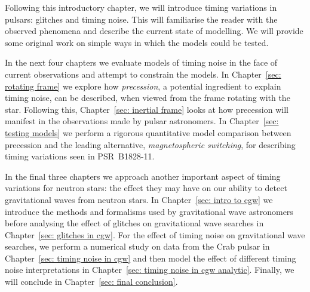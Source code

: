 \documentclass[../full_thesis/full_thesis.tex]{subfiles}
\begin{document}
Following this introductory chapter, we will introduce timing variations in
pulsars: glitches and timing noise. This will familiarise the reader with the
observed phenomena and describe the current state of modelling.  We will
provide some original work on simple ways in which the models could be tested.

In the next four chapters we evaluate models of timing noise in the face of
current observations and attempt to constrain the models.  In Chapter~\ref{sec:
rotating frame} we explore how \emph{precession}, a potential ingredient to
explain timing noise, can be described, when viewed from the frame rotating
with the star. Following this, Chapter~\ref{sec: inertial frame} looks at how
precession will manifest in the observations made by pulsar astronomers. In
Chapter~\ref{sec: testing models} we perform a rigorous quantitative model
comparison between precession and the leading alternative, \emph{magnetospheric
switching}, for describing timing variations seen in PSR~B1828-11.

In the final three chapters we approach another important aspect of timing
variations for neutron stars: the effect they may have on our ability to detect
gravitational waves from neutron stars. In Chapter~\ref{sec: intro to cgw} we
introduce the methods and formalisms used by gravitational wave astronomers
before analysing the effect of glitches on gravitational wave searches in
Chapter~\ref{sec: glitches in cgw}. For the effect of timing noise on
gravitational wave searches, we perform a numerical study on data from the Crab
pulsar in Chapter~\ref{sec: timing noise in cgw} and then model the effect of
different timing noise interpretations in Chapter~\ref{sec: timing noise in
cgw analytic}. Finally, we will conclude in Chapter~\ref{sec: final conclusion}.

\biblio
\end{document}
